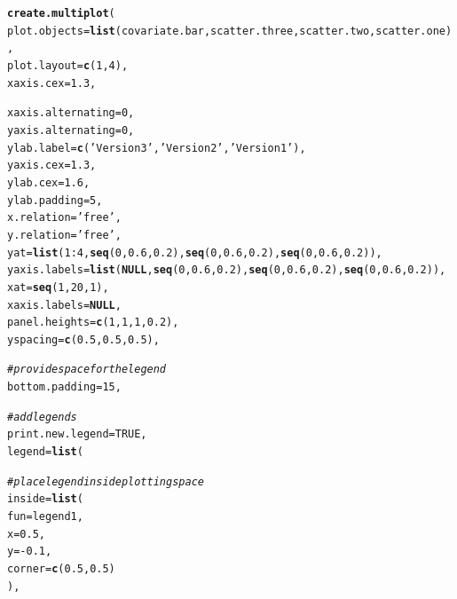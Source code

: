 \documentclass[letterpaper]{report}\usepackage[]{graphicx}\usepackage[]{color}
\makeatletter
\newcommand{\hlnum}[1]{\textcolor[rgb]{0.686,0.059,0.569}{#1}}%
\newcommand{\hlstr}[1]{\textcolor[rgb]{0.192,0.494,0.8}{#1}}%
\newcommand{\hlcom}[1]{\textcolor[rgb]{0.678,0.584,0.686}{\textit{#1}}}%
\newcommand{\hlopt}[1]{\textcolor[rgb]{0,0,0}{#1}}%
\newcommand{\hlstd}[1]{\textcolor[rgb]{0.345,0.345,0.345}{#1}}%
\newcommand{\hlkwa}[1]{\textcolor[rgb]{0.161,0.373,0.58}{\textbf{#1}}}%
\newcommand{\hlkwc}[1]{\textcolor[rgb]{0.333,0.667,0.333}{#1}}%
\newcommand{\hlkwd}[1]{\textcolor[rgb]{0.737,0.353,0.396}{\textbf{#1}}}%
\newenvironment{kframe}{%
 \def\at@end@of@kframe{}%
 \ifinner\ifhmode%
  \def\at@end@of@kframe{\end{minipage}}%
  \begin{minipage}{\columnwidth}%
 \fi\fi%
 \def\FrameCommand##1{\hskip\@totalleftmargin \hskip-\fboxsep
 \colorbox{shadecolor}{##1}\hskip-\fboxsep
     \hskip-\linewidth \hskip-\@totalleftmargin \hskip\columnwidth}%
 \MakeFramed {\advance\hsize-\width
   \@totalleftmargin\z@ \linewidth\hsize
   \@setminipage}}%
 {\par\unskip\endMakeFramed%
 \at@end@of@kframe}
\newenvironment{knitrout}{}{} %
\makeatother
\begin{document}
\begin{knitrout}
\color{fgcolor}\begin{kframe}
\begin{alltt}
\hlkwd{create.multiplot}\hlstd{(}
    \hlkwc{plot.objects} \hlstd{=} \hlkwd{list}\hlstd{(covariate.bar, scatter.three, scatter.two, scatter.one),}
    \hlkwc{plot.layout} \hlstd{=} \hlkwd{c}\hlstd{(}\hlnum{1}\hlstd{,}\hlnum{4}\hlstd{),}
    \hlkwc{xaxis.cex} \hlstd{=} \hlnum{1.3}\hlstd{,}

    \hlkwc{xaxis.alternating} \hlstd{=} \hlnum{0}\hlstd{,}
    \hlkwc{yaxis.alternating} \hlstd{=} \hlnum{0}\hlstd{,}
    \hlkwc{ylab.label} \hlstd{=} \hlkwd{c}\hlstd{(}\hlstr{'Version 3'}\hlstd{,} \hlstr{'Version 2'}\hlstd{,} \hlstr{'Version 1'}\hlstd{),}
    \hlkwc{yaxis.cex} \hlstd{=} \hlnum{1.3}\hlstd{,}
    \hlkwc{ylab.cex} \hlstd{=} \hlnum{1.6}\hlstd{,}
    \hlkwc{ylab.padding} \hlstd{=} \hlnum{5}\hlstd{,}
    \hlkwc{x.relation} \hlstd{=} \hlstr{'free'}\hlstd{,}
    \hlkwc{y.relation} \hlstd{=} \hlstr{'free'}\hlstd{,}
    \hlkwc{yat} \hlstd{=} \hlkwd{list}\hlstd{(}\hlnum{1}\hlopt{:}\hlnum{4}\hlstd{,} \hlkwd{seq}\hlstd{(}\hlnum{0}\hlstd{,} \hlnum{0.6}\hlstd{,} \hlnum{0.2}\hlstd{),} \hlkwd{seq}\hlstd{(}\hlnum{0}\hlstd{,} \hlnum{0.6}\hlstd{,} \hlnum{0.2}\hlstd{),} \hlkwd{seq}\hlstd{(}\hlnum{0}\hlstd{,} \hlnum{0.6}\hlstd{,} \hlnum{0.2}\hlstd{)),}
    \hlkwc{yaxis.labels} \hlstd{=} \hlkwd{list}\hlstd{(}\hlkwa{NULL}\hlstd{,} \hlkwd{seq}\hlstd{(}\hlnum{0}\hlstd{,} \hlnum{0.6}\hlstd{,} \hlnum{0.2}\hlstd{),} \hlkwd{seq}\hlstd{(}\hlnum{0}\hlstd{,} \hlnum{0.6}\hlstd{,} \hlnum{0.2}\hlstd{),} \hlkwd{seq}\hlstd{(}\hlnum{0}\hlstd{,} \hlnum{0.6}\hlstd{,} \hlnum{0.2}\hlstd{)),}
    \hlkwc{xat} \hlstd{=} \hlkwd{seq}\hlstd{(}\hlnum{1}\hlstd{,} \hlnum{20}\hlstd{,} \hlnum{1}\hlstd{),}
    \hlkwc{xaxis.labels} \hlstd{=} \hlkwa{NULL}\hlstd{,}
    \hlkwc{panel.heights} \hlstd{=} \hlkwd{c}\hlstd{(}\hlnum{1}\hlstd{,} \hlnum{1}\hlstd{,} \hlnum{1}\hlstd{,} \hlnum{0.2}\hlstd{),}
    \hlkwc{yspacing} \hlstd{=} \hlkwd{c}\hlstd{(}\hlnum{0.5}\hlstd{,} \hlnum{0.5}\hlstd{,} \hlnum{0.5}\hlstd{),}

    \hlcom{# provide space for the legend}
    \hlkwc{bottom.padding} \hlstd{=} \hlnum{15}\hlstd{,}

    \hlcom{# add legends}
    \hlkwc{print.new.legend} \hlstd{=} \hlnum{TRUE}\hlstd{,}
    \hlkwc{legend} \hlstd{=} \hlkwd{list}\hlstd{(}

        \hlcom{# place legend inside plotting space}
        \hlkwc{inside} \hlstd{=} \hlkwd{list}\hlstd{(}
            \hlkwc{fun} \hlstd{= legend1,}
            \hlkwc{x} \hlstd{=} \hlnum{0.5}\hlstd{,}
            \hlkwc{y} \hlstd{=} \hlopt{-}\hlnum{0.1}\hlstd{,}
            \hlkwc{corner} \hlstd{=} \hlkwd{c}\hlstd{(}\hlnum{0.5}\hlstd{,} \hlnum{0.5}\hlstd{)}
            \hlstd{),}


\end{alltt}
\end{kframe}
\end{knitrout}
\end{document}
